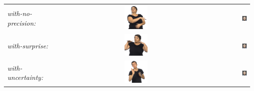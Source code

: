 \documentclass[../../main]{subfiles}
\begin{document}
\begin{longtable}{|l|c|r|}
    \emph{with-no-precision:} & \includegraphics[width=0.15\textwidth]{chapters/facial_expressions/images/original_facial_expressions/with_no_precision.png} & \includegraphics[width=0.15\textwidth]{chapters/facial_expressions/images/synthesized_expressions/with_no_precision.png} \\
    \emph{with-surprise:} & \includegraphics[width=0.15\textwidth]{chapters/facial_expressions/images/original_facial_expressions/with_surprise.png} & \includegraphics[width=0.15\textwidth]{chapters/facial_expressions/images/synthesized_expressions/with_surprise.png} \\
    \emph{with-uncertainty:} & \includegraphics[width=0.15\textwidth]{chapters/facial_expressions/images/original_facial_expressions/with_uncertainty.png} & \includegraphics[width=0.15\textwidth]{chapters/facial_expressions/images/synthesized_expressions/with_uncertainty.png} \\

\end{longtable}
\end{document}
